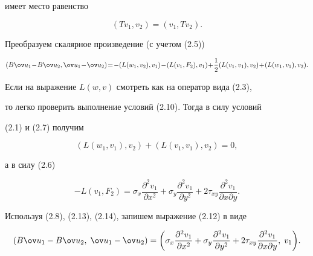 имеет место равенство 


\begin{equation} 


(Tv_1,v_2)=(v_1,Tv_2). 


\end{equation} 


Преобразуем скалярное произведение (с учетом (2.5)) 


{\mathsurround=0pt


\begin{equation} 


(B\ov u_1\!-\!B\ov u_2,\ov u_1\!-\!\ov u_2)\!= \!


-(L(w_1,v_2),v_1)\!-\!(L(v_1,F_2),v_1)\!+\! 


\frac{1}{2}(L(v_1,v_1),v_2)\!+\!(L(w_1,v_1),v_2). 


\end{equation} 


}


Если на выражение $L(w,v)$ смотреть как на оператор вида (2.3), 


то легко проверить выполнение условий (2.10). Тогда в силу условий 


(2.1) и (2.7) получим 


\begin{equation} 


(L(w_1,v_1),v_2)+(L(v_1,v_1),v_2)=0, 


\end{equation} 


а в силу (2.6) 


\begin{equation} 


-L(v_1,F_2)=\sigma_x\frac{\partial^2 v_1}{\partial x^2}+ 


\sigma_y\frac{\partial^2 v_1}{\partial y^2}+2\tau_{xy} 


\frac{\partial^2 v_1}{\partial x\partial y}. 


\end{equation} 


Используя (2.8), (2.13), (2.14), запишем выражение (2.12) в виде 


\begin{equation} 


(B\ov u_1-B\ov u_2,\;\ov u_1-\ov u_2)=\biggl(\sigma_x 


\frac{\partial^2 v_1}{\partial x^2}+\sigma_y 


\frac{\partial^2 v_1}{\partial y^2}+2\tau_{xy} 


\frac{\partial^2 v_1}{\partial x\partial y},\;v_1\biggr). 


\end{equation} 


